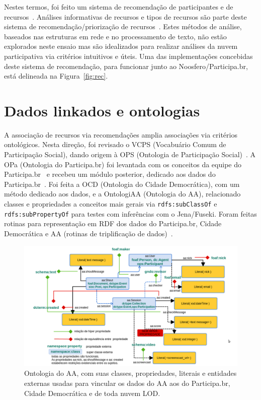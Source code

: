 \documentclass[a4paper, 11pt]{article} %
\begin{document}
Nestes termos, foi feito um sistema de recomendação de participantes e de recursos~\cite{pnud4}. Análises informativas de recursos e tipos de recursos são parte deste sistema de recomendação/priorização de recursos~\cite{pnud3}. Estes métodos de análise, baseados nas estruturas em rede e no processamento de texto, não estão explorados neste ensaio mas são idealizados para realizar análises da nuvem participativa via critérios intuitivos e úteis.
 Uma das implementações concebidas deste sistema de recomendação, para funcionar junto ao Noosfero/Participa.br, está delineada na Figura~\ref{fig:rec}.



\section*{Dados linkados e ontologias}
A associação de recursos via recomendações amplia associações via critérios ontológicos. Nesta direção, foi revisado o VCPS (Vocabuário Comum de Participação Social), dando origem à OPS (Ontologia de Participação Social)~\cite{OPS}. A OPa (Ontologia do Participa.br) foi levantada com os conceitos da equipe do Participa.br~\cite{OPA} e recebeu um módulo posterior, dedicado aos dados do Participa.br~\cite{pnud5}. Foi feita a OCD (Ontologia do Cidade Democrática), com um método dedicado aos dados, e a OntologiAA (Ontologia do AA), relacionado classes e propriedades a conceitos mais gerais via \texttt{rdfs:subClassOf} e \texttt{rdfs:subPropertyOf} para testes com inferências com o Jena/Fuseki. Foram feitas rotinas para representação em RDF dos dados do Participa.br, Cidade Democrática e AA (rotinas de triplificação de dados)~\cite{pnud5}.
\begin{figure}[h!]
  \centering
    \includegraphics[width=1.\textwidth]{ontologiaa.png}
  \caption{\small Ontologia do AA, com suas classes, propriedades, literais e entidades externas usadas para vincular os dados do AA aos do Participa.br, Cidade Democrática e de toda nuvem LOD.}\label{fig:ontologiaa}
\end{figure}
\end{document}

